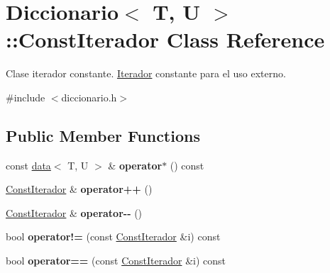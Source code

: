 \hypertarget{classDiccionario_1_1ConstIterador}{}\section{Diccionario$<$ T, U $>$\+:\+:Const\+Iterador Class Reference}
\label{classDiccionario_1_1ConstIterador}


Clase iterador constante. \hyperlink{classDiccionario_1_1Iterador}{Iterador} constante para el uso externo.  




{\ttfamily \#include $<$diccionario.\+h$>$}

\subsection*{Public Member Functions}
\begin{DoxyCompactItemize}
\item 
\mbox{\label{classDiccionario_1_1ConstIterador_aa579fc2c2be6037b99699c082e6f1676}} 
const \hyperlink{structdata}{data}$<$ T, U $>$ \& {\bfseries operator$\ast$} () const
\item 
\mbox{\label{classDiccionario_1_1ConstIterador_aad8c155430d5990e22bfcb1803e11738}} 
\hyperlink{classDiccionario_1_1ConstIterador}{Const\+Iterador} \& {\bfseries operator++} ()
\item 
\mbox{\label{classDiccionario_1_1ConstIterador_ad2b5e2dc456e38b69aab86a32c3015e9}} 
\hyperlink{classDiccionario_1_1ConstIterador}{Const\+Iterador} \& {\bfseries operator-\/-\/} ()
\item 
\mbox{\label{classDiccionario_1_1ConstIterador_adb72570ad332104823426da00ed31c1b}} 
bool {\bfseries operator!=} (const \hyperlink{classDiccionario_1_1ConstIterador}{Const\+Iterador} \&i) const
\item 
\mbox{\label{classDiccionario_1_1ConstIterador_a860cd5c43ce28068726161a7997e4d9f}} 
bool {\bfseries operator==} (const \hyperlink{classDiccionario_1_1ConstIterador}{Const\+Iterador} \&i) const
\end{DoxyCompactItemize}
